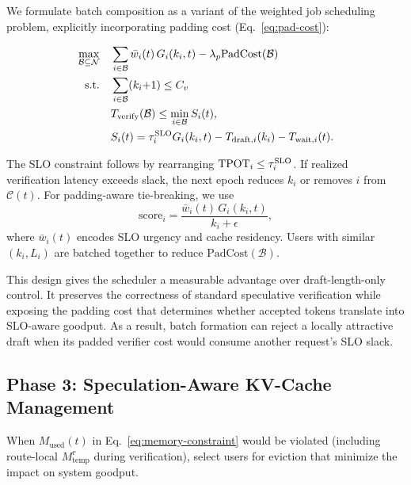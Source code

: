 \documentclass[journal]{IEEEtran}
\begin{document}
We formulate batch composition as a variant of 
the weighted job scheduling problem, explicitly 
incorporating padding cost (Eq.~\eqref{eq:pad-cost}):

\begin{equation}
    \label{eq:batch-opt}
    \begin{aligned}
    \max_{\mathcal{B} \subseteq \mathcal{N}} \quad 
    & \sum_{i \in \mathcal{B}} \bar{w}_i(t) \, G_i(k_i, t) 
    - \lambda_p \text{PadCost}(\mathcal{B}) \\
    \text{s.t.} \quad 
    & \sum_{i \in \mathcal{B}} (k_i{+}1) \leq C_v \\
    & T_{\textup{verify}}(\mathcal{B}) \leq 
    \min_{i \in \mathcal{B}} S_i(t), \\
    & S_i(t)=\tau_i^{\text{SLO}} G_i(k_i, t) 
    - T_{\textup{draft},i}(k_i) 
    - T_{\textup{wait},i}(t).
    \end{aligned}
\end{equation}

The SLO constraint follows by rearranging
$\textup{TPOT}_i \leq \tau_i^{\text{SLO}}$. If realized
verification latency exceeds slack, the next epoch reduces $k_i$ or
removes $i$ from $\mathcal{C}(t)$. For padding-aware tie-breaking,
we use
\begin{equation}
    \label{eq:priority}
    \text{score}_i = 
    \frac{\bar{w}_i(t) \, G_i(k_i, t)}{k_i + \epsilon},
\end{equation}
where $\bar{w}_i(t)$ encodes SLO urgency and cache residency. Users
with similar $(k_i,L_i)$ are batched together to reduce
$\text{PadCost}(\mathcal{B})$.

This design gives the scheduler a measurable advantage over
draft-length-only control. It preserves the correctness of standard
speculative verification while exposing the padding cost that determines
whether accepted tokens translate into SLO-aware goodput. As a result,
batch formation can reject a locally attractive draft when its padded
verifier cost would consume another request's SLO slack.

\subsection{Phase 3: Speculation-Aware KV-Cache Management}
\label{sec:alg-cache}

When $M_{\text{used}}(t)$ in Eq.~\eqref{eq:memory-constraint} 
would be violated (including route-local $M_{\text{temp}}^r$ during 
verification), select users for eviction that minimize the 
impact on system goodput.
\end{document}
